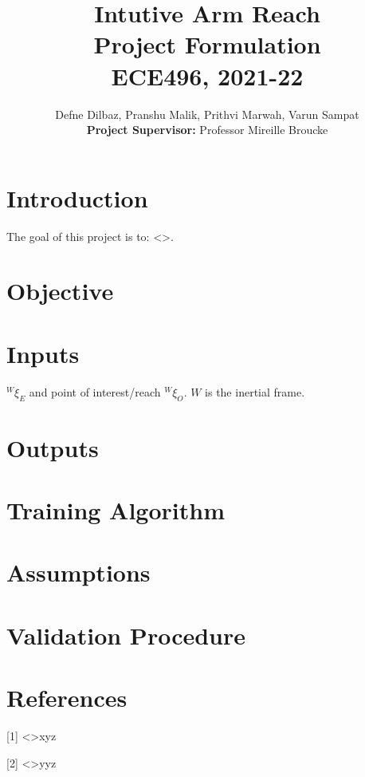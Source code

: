 \documentclass[10pt]{article}
\date{}
\begin{document}
\title{\vspace{-1cm}\textbf{\Large{Intutive Arm Reach}} \\ \Large{Project Formulation} \\ \textbf{\small{ECE496, 2021-22}}\\\vspace{-0.3cm}}
\author{Defne Dilbaz, Pranshu Malik, Prithvi Marwah, Varun Sampat \\\small{\textbf{Project Supervisor:}} Professor Mireille Broucke \vspace{-3cm}}

\maketitle

\section{Introduction}
The goal of this project is to: <>. 

\section{Objective}

\section{Inputs}
$^{W}\xi_{E}$ and point of interest/reach $^{W}\xi_{O}$. $W$ is the inertial frame.
\section{Outputs}

\section{Training Algorithm}

\section{Assumptions}

\section{Validation Procedure}

\section*{References}
[1] <>xyz

[2] <>yyz
\end{document}
